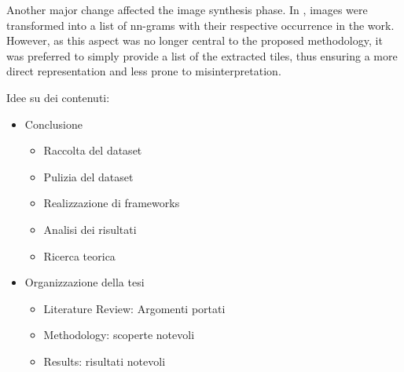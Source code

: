 \begin{toReview}
		\noindent Another major change affected the image synthesis phase. In \cite{thesis}, images were transformed into a list of nn-grams with their respective occurrence in the work. However, as this aspect was no longer central to the proposed methodology, it was preferred to simply provide a list of the extracted tiles, thus ensuring a more direct representation and less prone to misinterpretation.
\end{toReview}
\begin{toDo}
	Idee su dei contenuti:
	\begin{itemize}
		\item Conclusione
		\begin{itemize}
			\item Raccolta del dataset
			\item Pulizia del dataset
			\item Realizzazione di frameworks
			\item Analisi dei risultati
			\item Ricerca teorica
		\end{itemize}
		\item Organizzazione della tesi
		\begin{itemize}
			\item Literature Review: Argomenti portati
			\item Methodology: scoperte notevoli
			\item Results: risultati notevoli
		\end{itemize}
	\end{itemize}
\end{toDo}
